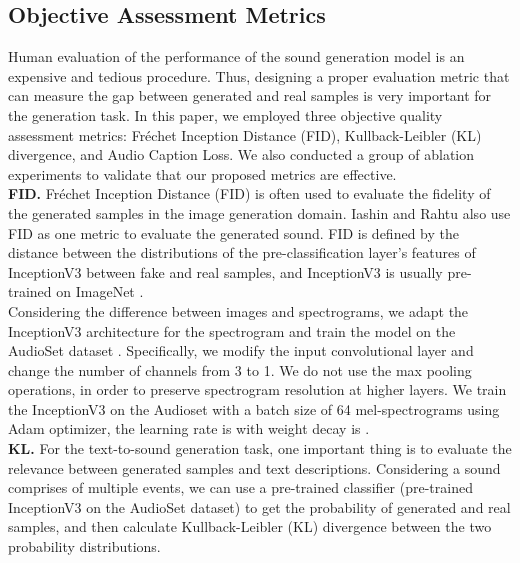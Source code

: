 \documentclass[lettersize,journal]{IEEEtran}
\begin{document}
\subsection{Objective Assessment Metrics}
Human evaluation of the performance of the sound generation model is an expensive and tedious procedure. Thus, designing a proper evaluation metric that can measure the gap between generated and real samples is very important for the generation task. In this paper, we employed three objective quality assessment metrics: Fréchet Inception Distance (FID), Kullback-Leibler (KL) divergence, and Audio Caption Loss. We also conducted a group of ablation experiments to validate that our proposed metrics are effective. \\
\textbf{FID.} Fréchet Inception Distance (FID) \cite{heusel2017gans} is often used to evaluate the fidelity of the generated samples in the image generation domain. Iashin and Rahtu \cite{iashin2021taming} also use FID as one metric to evaluate the generated sound. FID is defined by the distance between the distributions of the pre-classification layer’s features of InceptionV3 \cite{szegedy2016rethinking} between fake and real samples, and InceptionV3 is usually pre-trained on ImageNet \cite{deng2009imagenet}.
{\color{black}{The mathematics definition of FID as follow:

where  and  denote the mean of features extracted from real and generated samples.  and  are the covariance matrix of features extracted from real and generated samples.  denotes the trace of the matrix.}}\\
Considering the difference between images and spectrograms, we adapt the InceptionV3 architecture \cite{szegedy2016rethinking} for the spectrogram and train the model on the AudioSet dataset \cite{gemmeke2017audio}. Specifically, we modify the input convolutional layer and change the number of channels from 3 to 1. We do not use the max pooling operations, in order to preserve {\color{black}spectrogram} resolution at higher layers. We train the InceptionV3 on the Audioset with a batch size of 64 mel-spectrograms using Adam optimizer, the learning rate is  with weight decay is .\\
\textbf{KL.} For the text-to-sound generation task, one important thing is to evaluate the relevance between generated samples and text descriptions. Considering a sound comprises of multiple events, we can use a pre-trained classifier (pre-trained InceptionV3 on the AudioSet dataset) to get the probability of generated and real samples, and then calculate Kullback-Leibler (KL) divergence between the two probability distributions.  \\
\end{document}
